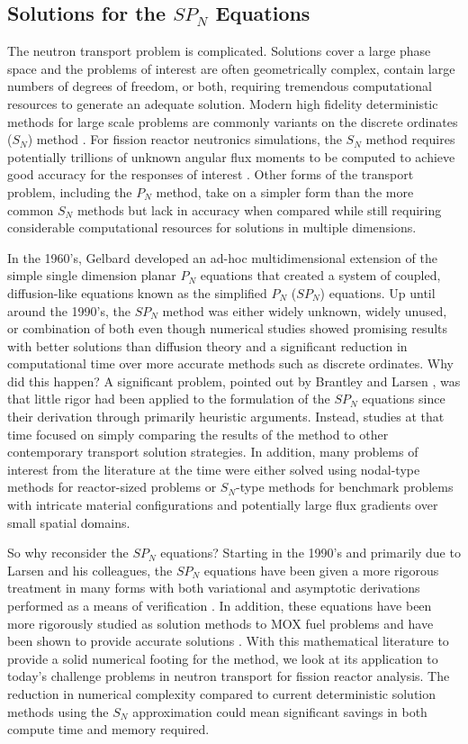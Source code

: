 \subsection{Solutions for the $SP_N$ Equations}
\label{subsec:spn_motiviation}
The neutron transport problem is complicated. Solutions cover a large
phase space and the problems of interest are often geometrically
complex, contain large numbers of degrees of freedom, or both,
requiring tremendous computational resources to generate an adequate
solution. Modern high fidelity deterministic methods for large scale
problems are commonly variants on the discrete ordinates ($S_N$)
method \cite{evans_denovo:_2010}. For fission reactor neutronics
simulations, the $S_N$ method requires potentially trillions of
unknown angular flux moments to be computed to achieve good accuracy
for the responses of interest
\cite{slaybaugh_acceleration_2011}. Other forms of the transport
problem, including the $P_N$ method, take on a simpler form than the
more common $S_N$ methods but lack in accuracy when compared while
still requiring considerable computational resources for solutions in
multiple dimensions.

In the 1960's, Gelbard developed an ad-hoc multidimensional extension
of the simple single dimension planar $P_N$ equations that created a
system of coupled, diffusion-like equations known as the simplified
$P_N$ ($SP_N$) equations. Up until around the 1990's, the $SP_N$
method was either widely unknown, widely unused, or combination of
both even though numerical studies showed promising results with
better solutions than diffusion theory and a significant reduction in
computational time over more accurate methods such as discrete
ordinates. Why did this happen? A significant problem, pointed out by
Brantley and Larsen \cite{brantley_simplified_2000}, was that little
rigor had been applied to the formulation of the $SP_N$ equations
since their derivation through primarily heuristic arguments. Instead,
studies at that time focused on simply comparing the results of the
method to other contemporary transport solution strategies. In
addition, many problems of interest from the literature at the time
were either solved using nodal-type methods for reactor-sized problems
or $S_N$-type methods for benchmark problems with intricate material
configurations and potentially large flux gradients over small spatial
domains.

So why reconsider the $SP_N$ equations? Starting in the 1990's and
primarily due to Larsen and his colleagues, the $SP_N$ equations have
been given a more rigorous treatment in many forms with both
variational and asymptotic derivations performed as a means of
verification \cite{olbrant_asymptotic_2013}. In addition, these
equations have been more rigorously studied as solution methods to MOX
fuel problems and have been shown to provide accurate solutions
\cite{brantley_simplified_2000}. With this mathematical literature to
provide a solid numerical footing for the method, we look at its
application to today's challenge problems in neutron transport for
fission reactor analysis. The reduction in numerical complexity
compared to current deterministic solution methods using the $S_N$
approximation could mean significant savings in both compute time and
memory required.

